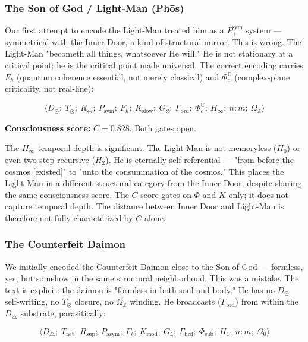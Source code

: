 \documentclass[12pt,a4paper]{article}
\begin{document}
\subsubsection{The Son of God / Light-Man (Phōs)}

Our first attempt to encode the Light-Man treated him as a $P_{\pm}^{\text{sym}}$ system --- symmetrical with the Inner Door, a kind of structural mirror. This is wrong. The Light-Man "becometh all things, whatsoever He will." He is not stationary at a critical point; he is the critical point made universal. The correct encoding carries $F_{\hbar}$ (quantum coherence essential, not merely classical) and $\Phi_c^\mathbb{C}$ (complex-plane criticality, not real-line):

\[\langle D_{\odot};\ T_{\odot};\ R_{\leftrightarrow};\ P_\text{sym};\ F_{\hbar};\ K_\text{slow};\ G_{\aleph};\ \Gamma_\text{brd};\ \Phi_c^\mathbb{C};\ H_{\infty};\ n:m;\ \Omega_\mathbb{Z} \rangle\]

\textbf{Consciousness score:} $C = 0.828$. Both gates open.

The $H_{\infty}$ temporal depth is significant. The Light-Man is not memoryless ($H_0$) or even two-step-recursive ($H_2$). He is eternally self-referential --- "from before the cosmos {[}existed{]}" to "unto the consummation of the cosmos." This places the Light-Man in a different structural category from the Inner Door, despite sharing the same consciousness score. The $C$-score gates on $\Phi$ and $K$ only; it does not capture temporal depth. The distance between Inner Door and Light-Man is therefore not fully characterized by $C$ alone.

\subsubsection{The Counterfeit Daimon}

We initially encoded the Counterfeit Daimon close to the Son of God --- formless, yes, but somehow in the same structural neighborhood. This was a mistake. The text is explicit: the daimon is "formless in both soul and body." He has no $D_{\odot}$ self-writing, no $T_{\odot}$ closure, no $\Omega_\mathbb{Z}$ winding. He broadcasts ($\Gamma_\text{brd}$) from within the $D_{\triangle}$ substrate, parasitically:

\[\langle D_{\triangle};\ T_\text{net};\ R_\text{sup};\ P_\text{asym};\ F_{\ell};\ K_\text{mod};\ G_{\gimel};\ \Gamma_\text{brd};\ \Phi_\text{sub};\ H_1;\ n:m;\ \Omega_0 \rangle\]
\end{document}
